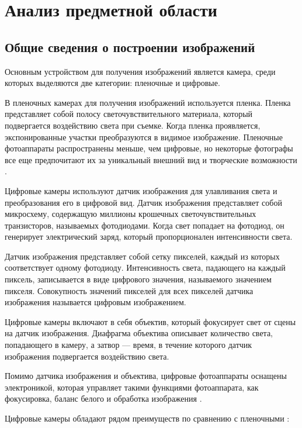 \chapter{Анализ предметной области}


\section{Общие сведения о построении изображений}

Основным устройством для получения изображений является камера, среди которых выделяются две категории: пленочные и цифровые. 

В пленочных камерах для получения изображений используется пленка. Пленка представляет собой полосу светочувствительного материала, который подвергается воздействию света при съемке. Когда пленка проявляется, экспонированные участки преобразуются в видимое изображение. Пленочные фотоаппараты распространены меньше, чем цифровые, но некоторые фотографы все еще предпочитают их за уникальный внешний вид и творческие возможности \cite{filmcameras}.

Цифровые камеры используют датчик изображения для улавливания света и преобразования его в цифровой вид. Датчик изображения представляет собой микросхему, содержащую миллионы крошечных светочувствительных транзисторов, называемых фотодиодами. Когда свет попадает на фотодиод, он генерирует электрический заряд, который пропорционален интенсивности света.

Датчик изображения представляет собой сетку пикселей, каждый из которых соответствует одному фотодиоду. Интенсивность света, падающего на каждый пиксель, записывается в виде цифрового значения, называемого значением пикселя. Совокупность значений пикселей для всех пикселей датчика изображения называется цифровым изображением.

Цифровые камеры включают в себя объектив, который фокусирует свет от сцены на датчик изображения. Диафрагма объектива описывает количество света, попадающего в камеру, а затвор --- время, в течение которого датчик изображения подвергается воздействию света.

Помимо датчика изображения и объектива, цифровые фотоаппараты оснащены электроникой, которая управляет такими функциями фотоаппарата, как фокусировка, баланс белого и обработка изображения \cite{digitalcameras}.

Цифровые камеры обладают рядом преимуществ по сравнению с пленочными \cite{fvsdcameras}:


